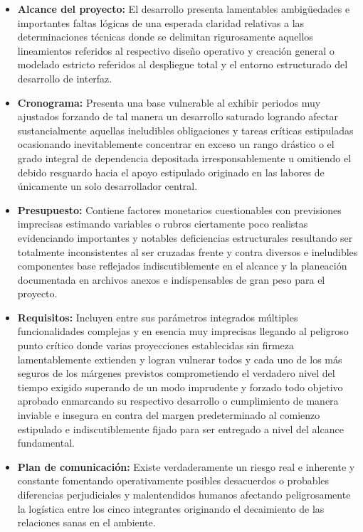 \documentclass[11pt,spanish]{article}
\begin{document}
\begin{itemize}
    \item \textbf{Alcance del proyecto:} El desarrollo presenta lamentables ambigüedades e importantes faltas lógicas de una esperada claridad relativas a las determinaciones técnicas donde se delimitan rigurosamente aquellos lineamientos referidos al respectivo diseño operativo y creación general o modelado estricto referidos al despliegue total y el entorno estructurado del desarrollo de interfaz.
    \item \textbf{Cronograma:} Presenta una base vulnerable al exhibir periodos muy ajustados forzando de tal manera un desarrollo saturado logrando afectar sustancialmente aquellas ineludibles obligaciones y tareas críticas estipuladas ocasionando inevitablemente concentrar en exceso un rango drástico o el grado integral de dependencia depositada irresponsablemente u omitiendo el debido resguardo hacia el apoyo estipulado originado en las labores de únicamente un solo desarrollador central.
    \item \textbf{Presupuesto:} Contiene factores monetarios cuestionables con previsiones imprecisas estimando variables o rubros ciertamente poco realistas evidenciando importantes y notables deficiencias estructurales resultando ser totalmente inconsistentes al ser cruzadas frente y contra diversos e ineludibles componentes base reflejados indiscutiblemente en el alcance y la planeación documentada en archivos anexos e indispensables de gran peso para el proyecto.
    \item \textbf{Requisitos:} Incluyen entre sus parámetros integrados múltiples funcionalidades complejas y en esencia muy imprecisas llegando al peligroso punto crítico donde varias proyecciones establecidas sin firmeza lamentablemente extienden y logran vulnerar todos y cada uno de los más seguros de los márgenes previstos comprometiendo el verdadero nivel del tiempo exigido superando de un modo imprudente y forzado todo objetivo aprobado enmarcando su respectivo desarrollo o cumplimiento de manera inviable e insegura en contra del margen predeterminado al comienzo estipulado e indiscutiblemente fijado para ser entregado a nivel del alcance fundamental.
    \item \textbf{Plan de comunicación:} Existe verdaderamente un riesgo real e inherente y constante fomentando operativamente posibles desacuerdos o probables diferencias perjudiciales y malentendidos humanos afectando peligrosamente la logística entre los cinco integrantes originando el decaimiento de las relaciones sanas en el ambiente.
\end{itemize}
\end{document}

